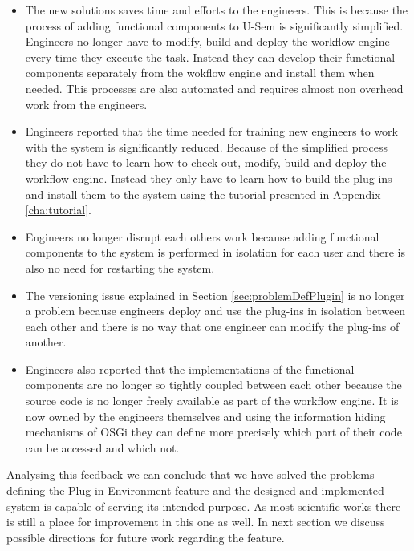\begin{itemize}
	\item The new solutions saves time and efforts to the engineers. This is because the process of adding functional components to U-Sem is significantly simplified. Engineers no longer have to modify, build and deploy the workflow engine every time they execute the task. Instead they can develop their functional components separately from the wokflow engine and install them when needed. This processes are also automated and requires almost non overhead work from the engineers. 
	
	\item Engineers reported that the time needed for training new engineers to work with the system is significantly reduced. Because of the simplified process they do not have to learn how to check out, modify, build and deploy the workflow engine. Instead they only have to learn how to build the plug-ins and install them to the system using the tutorial presented in Appendix \ref{cha:tutorial}.
	
	\item Engineers no longer disrupt each others work because adding functional components to the system is performed in isolation for each user and there is also no need for restarting the system. 
	
	\item The versioning issue explained in Section \ref{sec:problemDefPlugin} is no longer a problem because engineers deploy and use the plug-ins in isolation between each other and there is no way that one engineer can modify the plug-ins of another.
	
	\item Engineers also reported that the implementations of the functional components are no longer so tightly coupled between each other because the source code is no longer freely available as part of the workflow engine. It is now owned by the engineers themselves and using the information hiding mechanisms of OSGi they can define more precisely which part of their code can be accessed and which not.
	 
\end{itemize} 

Analysing this feedback we can conclude that we have solved the problems defining the Plug-in Environment feature and the designed and implemented system is capable of serving its intended purpose. As most scientific works there is still a place for improvement in this one as well. In next section we discuss possible directions for future work regarding the feature.


